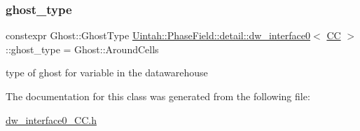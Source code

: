 \subsubsection{\texorpdfstring{ghost\+\_\+type}{ghost\_type}}
{\footnotesize\ttfamily constexpr Ghost\+::\+Ghost\+Type \hyperlink{classUintah_1_1PhaseField_1_1detail_1_1dw__interface0}{Uintah\+::\+Phase\+Field\+::detail\+::dw\+\_\+interface0}$<$ \hyperlink{namespaceUintah_1_1PhaseField_a33d355affda78a83f45755ba8388cedda22303704507d024d1d6508ed9859a85a}{CC} $>$\+::ghost\+\_\+type = Ghost\+::\+Around\+Cells\hspace{0.3cm}{\ttfamily [static]}}



type of ghost for variable in the datawarehouse 



The documentation for this class was generated from the following file\+:\begin{DoxyCompactItemize}
\item 
\hyperlink{dw__interface0__CC_8h}{dw\+\_\+interface0\+\_\+\+C\+C.\+h}\end{DoxyCompactItemize}

